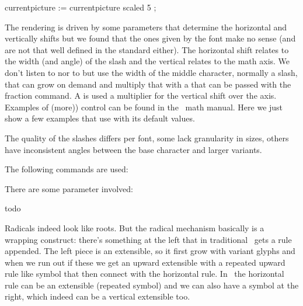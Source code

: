     currentpicture := currentpicture scaled 5 ;
\stopMPcode
\stoplinecorrection

The rendering is driven by some parameters that determine the horizontal and
vertically shifts but we found that the ones given by the font make no sense (and
are not that well defined in the standard either). The horizontal shift relates
to the width (and angle) of the slash and the vertical relates to the math axis.
We don't listen to  nor to  but use the width of the middle character, normally a slash, that can grow
on demand and multiply that with a  that can be passed with the
fraction command. A  is used a multiplier for the vertical shift
over the axis. Examples of (more)) control can be found in the \CONTEXT\ math
manual. Here we just show a few examples that use \type {\vfrac} with its
default values.

\startlinecorrection
{} {}
    {} {}
    {} {}
    {} {}
    {} {}
    {} {}
\stopcombination
\stoplinecorrection

The quality of the slashes differs per font, some lack granularity in sizes,
others have inconsistent angles between the base character and larger variants.

The following commands are used:

\starttyping
\Uskewed
\Uskewedwithdelims
\stoptyping

There are some parameter involved:

\starttyping
\Umathskeweddelimitertolerance
\Umathskewedfractionhgap
\Umathskewedfractionvgap
\stoptyping

\stopsection

\startsection[title=Math fractions]

todo

\stopsection

\startsection[title=Math radicals]

Radicals indeed look like roots. But the radical mechanism basically is a
wrapping construct: there's something at the left that in traditional \TEX\ gets
a rule appended. The left piece is an extensible, so it first grow with variant
glyphs and when we run out if these we get an upward extensible with a repeated
upward rule like symbol that then connect with the horizontal rule. In
\LUAMETATEX\ the horizontal rule can be an extensible (repeated symbol) and we
can also have a symbol at the right, which indeed can be a vertical extensible
too.

